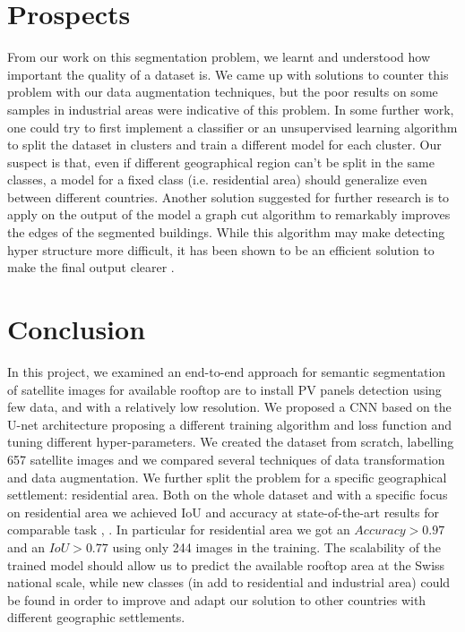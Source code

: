 \documentclass[9pt,conference,compsocconf]{IEEEtran}
\begin{document}
\section{Prospects}
From our work on this segmentation problem, we learnt and understood how important the quality of a dataset is. We came up with solutions to counter this problem with our data augmentation techniques, but the poor results on some samples in industrial areas were indicative of this problem. In some further work, one could try to first implement a classifier or an unsupervised learning algorithm to split the dataset in clusters and train a different model for each cluster. Our suspect is that, even if different geographical region can't be split in the same classes, a model for a fixed class (i.e. residential area) should generalize even between different countries.
Another solution suggested for further research is to apply on the output of the model a graph cut algorithm to remarkably improves the edges of the segmented buildings. While this algorithm may make detecting hyper structure more difficult, it has been shown to be an efficient solution to make the final output clearer \cite{rs9070701}.

\section{Conclusion}

In this project, we examined an end-to-end approach for semantic segmentation of satellite images for available rooftop are to install PV panels detection using few data, and with a relatively low resolution.
We proposed a CNN based on the U-net architecture proposing a different training  algorithm  and  loss  function  and  tuning  different  hyper-parameters.
We created the dataset from scratch, labelling 657 satellite images and we compared several techniques of data transformation and data augmentation. We further split the problem for a specific geographical settlement: residential area. Both on the whole dataset and with a specific focus on residential area we achieved IoU and accuracy at state-of-the-art results for comparable task \cite{castello2019deep}, \cite{chhor2017satellite}. In particular for residential area we got an $Accuracy >0.97$  and  an $IoU >0.77$  using  only  244  images  in  the  training. The scalability  of  the  trained  model  should  allow us  to  predict  the  available  rooftop  area  at  the  Swiss  national  scale,  while  new  classes  (in  add  to residential and industrial area) could be found in order to improve and adapt our solution to other countries with different geographic settlements.

\twocolumn[
\begin{@twocolumnfalse}
\nocite{*}


\end{@twocolumnfalse}
]
\end{document}
